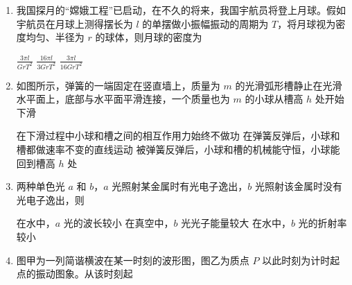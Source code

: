 \documentclass[\gkver]{gaokaozhenti}
\begin{document}
\begin{enumerate}

\item
我国探月的“嫦娥工程”已启动，在不久的将来，我国宇航员将登上月球。假如宇航员在月球上测得摆长为 $l$ 的单摆做小振幅振动的周期为 $T$，将月球视为密度均匀、半径为 $r$ 的球体，则月球的密度为

{$\frac{3\pi l}{GrT^{2}}$}
{$\frac{16\pi l}{3GrT^{2}}$}
{$\frac{3\pi l}{16GrT^{2}}$}


\item
如图所示，弹簧的一端固定在竖直墙上，质量为 $m$ 的光滑弧形槽静止在光滑水平面上，底部与水平面平滑连接，一个质量也为 $m$ 的小球从槽高 $h$ 处开始下滑


{在下滑过程中小球和槽之间的相互作用力始终不做功}
{在弹簧反弹后，小球和槽都做速率不变的直线运动}
{被弹簧反弹后，小球和槽的机械能守恒，小球能回到槽高 $h$ 处}


\item
两种单色光 $a$ 和 $b$，$a$ 光照射某金属时有光电子逸出，$b$ 光照射该金属时没有光电子逸出，则

{在水中，$a$ 光的波长较小}
{在真空中，$b$ 光光子能量较大}
{在水中，$b$ 光的折射率较小}


\item
图甲为一列简谐横波在某一时刻的波形图，图乙为质点 $P$ 以此时刻为计时起点的振动图象。从该时刻起


\end{enumerate}
\end{document}
